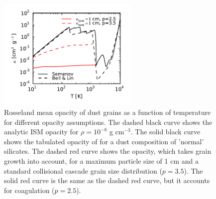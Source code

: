 \begin{figure}[H]
\centering
\includegraphics[width=0.6\textwidth]{figures/kappa_grain_growth_SBL_paper.pdf}
\vspace{-0.35in}
\caption{Rosseland mean opacity of dust grains as a function of temperature for different opacity assumptions. The dashed black curve shows the \citet{bell94} analytic ISM opacity for $\rho=10^{-8}$ g cm$^{-3}$. The solid black curve shows the tabulated opacity of \citet{semenov03} for a dust composition of 'normal' silicates. The dashed red curve shows the \citet{dalessio01} opacity, which takes grain growth into account, for a maximum particle size of 1 cm and a standard collisional cascade grain size distribution ($p=3.5$). The solid red curve is the same as the dashed red curve, but it accounts for coagulation ($p=2.5$).}
\label{fig:opacity}
\end{figure}

